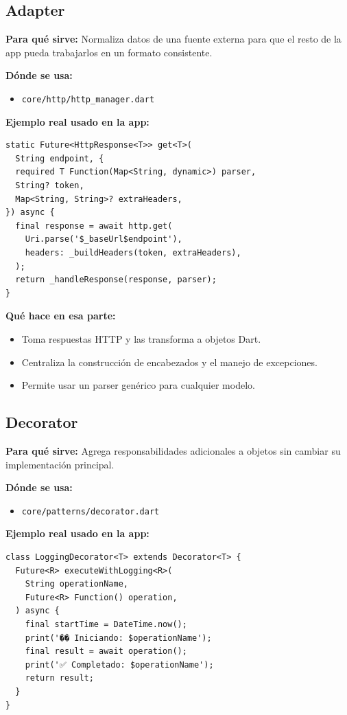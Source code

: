 \documentclass[12pt,a4paper]{article}
\begin{document}
\subsection{Adapter}
\textbf{Para qué sirve:} Normaliza datos de una fuente externa para que el resto de la app pueda trabajarlos en un formato consistente.

\textbf{Dónde se usa:}
\begin{itemize}
    \item \texttt{core/http/http_manager.dart}
\end{itemize}

\textbf{Ejemplo real usado en la app:}
\begin{lstlisting}
static Future<HttpResponse<T>> get<T>(
  String endpoint, {
  required T Function(Map<String, dynamic>) parser,
  String? token,
  Map<String, String>? extraHeaders,
}) async {
  final response = await http.get(
    Uri.parse('$_baseUrl$endpoint'),
    headers: _buildHeaders(token, extraHeaders),
  );
  return _handleResponse(response, parser);
}
\end{lstlisting}

\textbf{Qué hace en esa parte:}
\begin{itemize}
    \item Toma respuestas HTTP y las transforma a objetos Dart.
    \item Centraliza la construcción de encabezados y el manejo de excepciones.
    \item Permite usar un parser genérico para cualquier modelo.
\end{itemize}

\subsection{Decorator}
\textbf{Para qué sirve:} Agrega responsabilidades adicionales a objetos sin cambiar su implementación principal.

\textbf{Dónde se usa:}
\begin{itemize}
    \item \texttt{core/patterns/decorator.dart}
\end{itemize}

\textbf{Ejemplo real usado en la app:}
\begin{lstlisting}
class LoggingDecorator<T> extends Decorator<T> {
  Future<R> executeWithLogging<R>(
    String operationName,
    Future<R> Function() operation,
  ) async {
    final startTime = DateTime.now();
    print('�� Iniciando: $operationName');
    final result = await operation();
    print('✅ Completado: $operationName');
    return result;
  }
}
\end{lstlisting}
\end{document}
